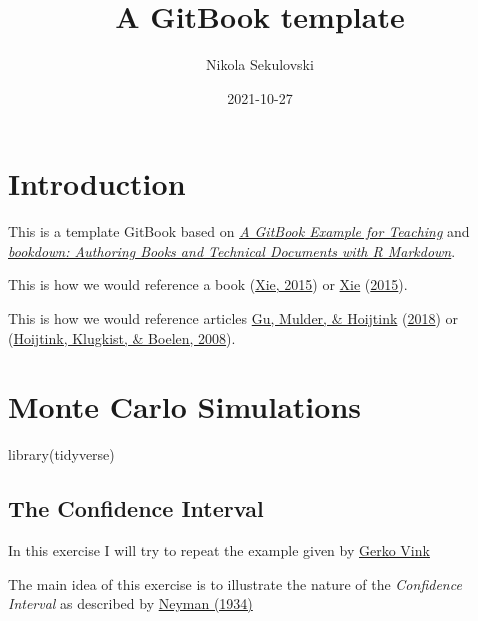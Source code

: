 \documentclass[
]{book}
\title{A GitBook template}
\author{Nikola Sekulovski}
\date{2021-10-27}
\newenvironment{Shaded}{\begin{snugshade}}{\end{snugshade}}
\newcommand{\FunctionTok}[1]{\textcolor[rgb]{0.00,0.00,0.00}{#1}}
\newcommand{\NormalTok}[1]{#1}
\begin{document}
\maketitle

{
\setcounter{tocdepth}{1}
\tableofcontents
}
\hypertarget{introduction}{%
\chapter{Introduction}\label{introduction}}

This is a template GitBook based on \href{https://cjvanlissa.github.io/gitbook-demo/}{\emph{A GitBook Example for Teaching}} and \href{https://bookdown.org/yihui/bookdown/}{\emph{bookdown: Authoring Books and Technical Documents with R Markdown}}.

This is how we would reference a book (\protect\hyperlink{ref-xie2015}{Xie, 2015}) or \protect\hyperlink{ref-xie2015}{Xie} (\protect\hyperlink{ref-xie2015}{2015}).

This is how we would reference articles \protect\hyperlink{ref-gu2018approximated}{Gu, Mulder, \& Hoijtink} (\protect\hyperlink{ref-gu2018approximated}{2018}) or (\protect\hyperlink{ref-hoijtink2008bayesian}{Hoijtink, Klugkist, \& Boelen, 2008}).

\hypertarget{monte-carlo-simulations}{%
\chapter{Monte Carlo Simulations}\label{monte-carlo-simulations}}

\begin{Shaded}
\begin{Highlighting}[]
\FunctionTok{library}\NormalTok{(tidyverse)}
\end{Highlighting}
\end{Shaded}

\hypertarget{the-confidence-interval}{%
\section{The Confidence Interval}\label{the-confidence-interval}}

In this exercise I will try to repeat the example given by \href{https://www.gerkovink.com/markup/Wk1/Solution_to_Ex1.html}{Gerko Vink}

The main idea of this exercise is to illustrate the nature of the \emph{Confidence Interval} as described by \href{http://www.stat.cmu.edu/~brian/905-2008/papers/neyman-1934-jrss.pdf}{Neyman (1934)}
\end{document}
